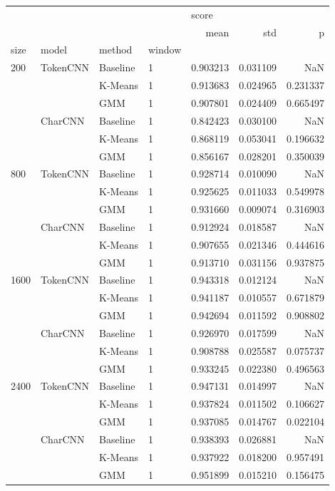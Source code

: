 \begin{tabular}{llllrrr}
\toprule
     &         &     &   & \multicolumn{3}{l}{score} \\
     &         &     &   &      mean &       std &         p \\
size & model & method & window &           &           &           \\
\midrule
200  & TokenCNN & Baseline & 1 &  0.903213 &  0.031109 &       NaN \\
     &         & K-Means & 1 &  0.913683 &  0.024965 &  0.231337 \\
     &         & GMM & 1 &  0.907801 &  0.024409 &  0.665497 \\
     & CharCNN & Baseline & 1 &  0.842423 &  0.030100 &       NaN \\
     &         & K-Means & 1 &  0.868119 &  0.053041 &  0.196632 \\
     &         & GMM & 1 &  0.856167 &  0.028201 &  0.350039 \\
800  & TokenCNN & Baseline & 1 &  0.928714 &  0.010090 &       NaN \\
     &         & K-Means & 1 &  0.925625 &  0.011033 &  0.549978 \\
     &         & GMM & 1 &  0.931660 &  0.009074 &  0.316903 \\
     & CharCNN & Baseline & 1 &  0.912924 &  0.018587 &       NaN \\
     &         & K-Means & 1 &  0.907655 &  0.021346 &  0.444616 \\
     &         & GMM & 1 &  0.913710 &  0.031156 &  0.937875 \\
1600 & TokenCNN & Baseline & 1 &  0.943318 &  0.012124 &       NaN \\
     &         & K-Means & 1 &  0.941187 &  0.010557 &  0.671879 \\
     &         & GMM & 1 &  0.942694 &  0.011592 &  0.908802 \\
     & CharCNN & Baseline & 1 &  0.926970 &  0.017599 &       NaN \\
     &         & K-Means & 1 &  0.908788 &  0.025587 &  0.075737 \\
     &         & GMM & 1 &  0.933245 &  0.022380 &  0.496563 \\
2400 & TokenCNN & Baseline & 1 &  0.947131 &  0.014997 &       NaN \\
     &         & K-Means & 1 &  0.937824 &  0.011502 &  0.106627 \\
     &         & GMM & 1 &  0.937085 &  0.014767 &  0.022104 \\
     & CharCNN & Baseline & 1 &  0.938393 &  0.026881 &       NaN \\
     &         & K-Means & 1 &  0.937922 &  0.018200 &  0.957491 \\
     &         & GMM & 1 &  0.951899 &  0.015210 &  0.156475 \\
\bottomrule
\end{tabular}
